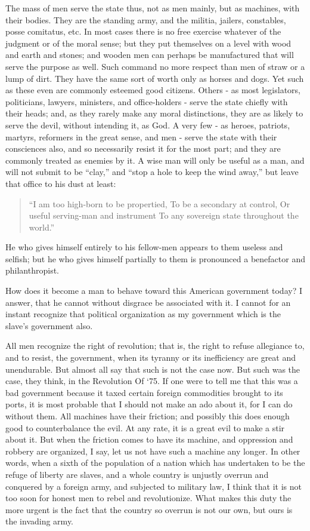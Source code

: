 \documentclass[letterpaper,12pt,english]{sphinxmanual}
\begin{document}
The mass of men serve the state thus, not as men mainly, but as machines, with their bodies. They are the standing army, and the militia, jailers, constables, posse comitatus, etc. In most cases there is no free exercise whatever of the judgment or of the moral sense; but they put themselves on a level with wood and earth and stones; and wooden men can perhaps be manufactured that will serve the purpose as well. Such command no more respect than men of straw or a lump of dirt. They have the same sort of worth only as horses and dogs. Yet such as these even are commonly esteemed good citizens. Others - as most legislators, politicians, lawyers, ministers, and office-holders - serve the state chiefly with their heads; and, as they rarely make any moral distinctions, they are as likely to serve the devil, without intending it, as God. A very few - as heroes, patriots, martyrs, reformers in the great sense, and men - serve the state with their consciences also, and so necessarily resist it for the most part; and they are commonly treated as enemies by it. A wise man will only be useful as a man, and will not submit to be ``clay,'' and ``stop a hole to keep the wind away,'' but leave that office to his dust at least:
\begin{quote}

``I am too high-born to be propertied,
To be a secondary at control,
Or useful serving-man and instrument
To any sovereign state throughout the world.''
\end{quote}

He who gives himself entirely to his fellow-men appears to them useless and selfish; but he who gives himself partially to them is pronounced a benefactor and philanthropist.

How does it become a man to behave toward this American government today? I answer, that he cannot without disgrace be associated with it. I cannot for an instant recognize that political organization as my government which is the slave's government also.

All men recognize the right of revolution; that is, the right to refuse allegiance to, and to resist, the government, when its tyranny or its inefficiency are great and unendurable. But almost all say that such is not the case now. But such was the case, they think, in the Revolution Of `75. If one were to tell me that this was a bad government because it taxed certain foreign commodities brought to its ports, it is most probable that I should not make an ado about it, for I can do without them. All machines have their friction; and possibly this does enough good to counterbalance the evil. At any rate, it is a great evil to make a stir about it. But when the friction comes to have its machine, and oppression and robbery are organized, I say, let us not have such a machine any longer. In other words, when a sixth of the population of a nation which has undertaken to be the refuge of liberty are slaves, and a whole country is unjustly overrun and conquered by a foreign army, and subjected to military law, I think that it is not too soon for honest men to rebel and revolutionize. What makes this duty the more urgent is the fact that the country so overrun is not our own, but ours is the invading army.
\end{document}
